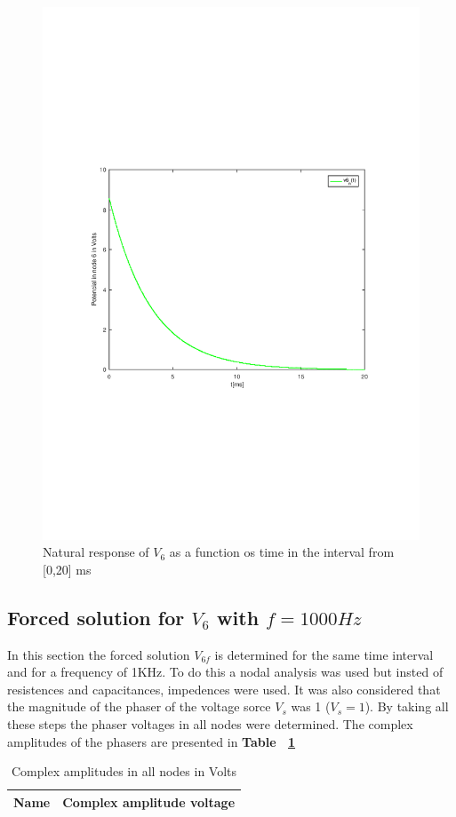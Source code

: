 \begin{figure}[H] \centering
\includegraphics[width=0.9\linewidth]{natural_tab.pdf}
\caption{Natural response of $V_6$ as a function os time in the interval from [0,20] ms}
\label{fig:natural}
\end{figure} 


\pagebreak
\subsection{Forced solution for $V_6$ with $f=1000Hz$}

In this section the forced solution $V_{6f}$ is determined for the same time interval and for a frequency of 1KHz. To do this a nodal analysis was used but insted of resistences and capacitances, impedences were used. It was also  considered that the magnitude of the phaser of the voltage sorce $V_s$  was 1 ($V_s=1$). By taking all these steps the phaser voltages in all nodes were determined. The complex amplitudes of the phasers are presented in  \textbf{Table ~\ref{tab:equivalent resistor}}
\begin{table}[H]
  \centering
  \begin{tabular}{|l|r|}
    \hline    
    {\bf Name} & {\bf Complex amplitude voltage}\\ \hline
    
  \end{tabular}
  \caption{Complex amplitudes in all nodes in Volts}
  \label{tab:equivalent resistor}
\end{table}
\vspace{10cm}

